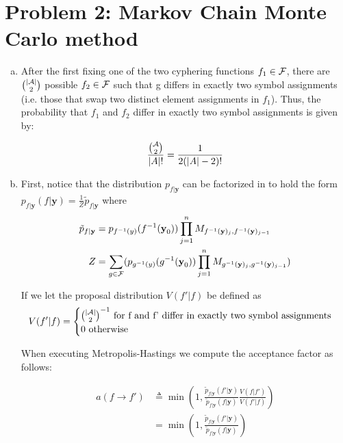 \documentclass{siamart190516}
\begin{document}
\section*{Problem 2: Markov Chain Monte Carlo method}
\label{sec:mcmc}
\begin{enumerate}[(a)]
  \item After the first fixing one of the two cyphering functions $f_1 \in \mathcal{F}$, there are $\binom{\left| \mathcal{A} \right|}{2}$ possible $f_2 \in \mathcal{F}$ such that g differs in exactly two symbol assignments (i.e. those that swap two distinct element assignments in $f_1$). Thus, the probability that $f_1$ and $f_2$ differ in exactly two symbol assignments is given by:

        \[
          \frac{\binom{\mathcal{A}}{2}}{\left| A \right|!} = \frac{1}{2(\left| A \right| - 2)!}
        \]

  \item First, notice that the distribution $p_{f | \textbf{y}}$ can be factorized in to hold the form $p_{f | \textbf{y}}(f | \textbf{y}) = \frac{1}{Z}\tilde{p}_{f | \textbf{y}}$ where
        \begin{align*}
          \tilde{p}_{f | \textbf{y}} & = p_{f^{-1}(y)}(f^{-1}(\textbf{y}_0)) \prod_{j = 1}^n M_{f^{-1}(\textbf{y})_{j}, f^{-1}(\textbf{y})_{j-1}}                  \\
          Z                          & = \sum_{g \in \mathcal{F}}(p_{g^{-1}(y)}(g^{-1}(\textbf{y}_0)) \prod_{j = 1}^n M_{g^{-1}(\textbf{y})_{j}, g^{-1}(\textbf{y})_{j-1}})
        \end{align*}

        If we let the proposal distribution $V(f' | f)$ be defined as
        \[
          V(f' | f) = \begin{cases}
            \binom{\left| \mathcal{A} \right|}{2}^{-1} \text{  for f and f' differ in exactly two symbol assignments} \\
            0 \text{  otherwise}
          \end{cases}
        \]

        When executing Metropolis-Hastings we compute the acceptance factor as follows:

        \begin{align*}
          a(f \rightarrow f') & \triangleq \min(1, \frac{\tilde{p}_{f | \textbf{y}}(f' | \textbf{y})}{\tilde{p}_{f | \textbf{y}}(f | \textbf{y})} \frac{V(f | f')}{V(f' | f)}) \\
                              & =\min(1, \frac{\tilde{p}_{f | \textbf{y}}(f' | \textbf{y})}{\tilde{p}_{f | \textbf{y}}(f | \textbf{y})})
        \end{align*}


\end{enumerate}
\end{document}
